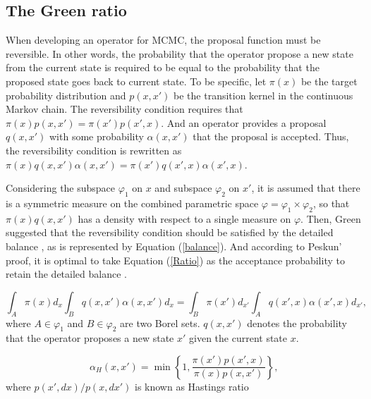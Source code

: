 \documentclass{bmcart}
\begin{document}
\begin{backmatter}
\subsection{The Green ratio}
When developing an operator for MCMC, the proposal function must be reversible. In other words, the probability that the operator propose a new state from the current state is required to be equal to the probability that the proposed state goes back to current state. To be specific, let ${\pi (x)}$ be the target probability distribution and $p(x, x')$ be the transition kernel in the continuous Markov chain. The reversibility condition requires that ${\pi (x)}{p(x, x')} = {\pi (x')}{p(x', x)}$. And an operator provides a proposal $q(x, x')$ with some probability $\alpha(x, x')$ that the proposal is accepted. Thus, the reversibility condition is rewritten as ${\pi (x)}{q(x, x')}{\alpha(x, x')} = {\pi (x')}{q(x', x)}{\alpha(x', x)}$. 

Considering the subspace $\varphi_1$ on $x$ and subspace $\varphi_2$ on $x'$, it is assumed that there is a symmetric measure on the combined parametric space $\varphi = {\varphi_1} \times {\varphi_2}$, so that ${\pi (x)}{q(x, x')}$ has a density with respect to a single measure on $\varphi$. Then, Green suggested that the reversibility condition should be satisfied by the detailed balance \cite{green1995reversible}, as is represented by Equation (\ref{balance}). And according to Peskun' proof, it is optimal to take Equation (\ref{Ratio}) as the acceptance probability to retain the detailed balance \cite{peskun1973optimum}.

\begin{equation}\label{balance}
\int_A {\pi (x) d_x} {\int_B  {q(x, x')}{\alpha(x, x')} d_x}  = \int_B {\pi (x') d_{x'}}{\int_A {q(x', x)}{\alpha(x', x)} d_{x'}} \text{,}
\end{equation}
where $A \in {\varphi_1}$ and $B \in  {\varphi_2}$ are two Borel sets. ${q(x, x')}$ denotes the probability that the operator proposes a new state $x'$ given the current state $x$.

\begin{equation}\label{Ratio}
{\alpha_H}(x, x') = \min \left\{ {1,\frac{{\pi (x'){p}(x',x)}}{{\pi (x){p}(x,x')}}} \right\} \text{,}
\end{equation}
where ${p(x',dx)}/{p(x,dx')}$ is known as Hastings ratio


\end{backmatter}
\end{document}
